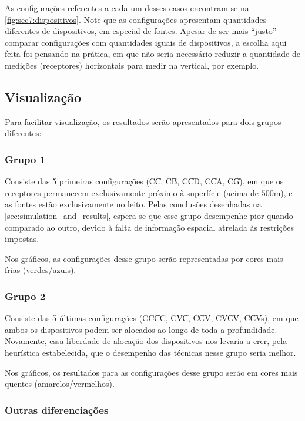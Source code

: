As configurações referentes a cada um desses casos encontram-se na \cref{fig:sec7:dispositivos}. Note que as configurações apresentam quantidades diferentes de dispositivos, em especial de fontes. Apesar de ser mais ``justo'' comparar configurações com quantidades iguais de dispositivos, a escolha aqui feita foi pensando na prática, em que não seria necessário reduzir a quantidade de medições (receptores) horizontais para medir na vertical, por exemplo.



\subsection{Visualização}

Para facilitar visualização, os resultados serão apresentados para dois grupos diferentes:

\subsubsection*{Grupo 1}

Consiste das 5 primeiras configurações (C\|C, C\|B, C\|CD, C\|CA, C\|G), em que os receptores permanecem exclusivamente próximo à superfície (acima de $500\si{\meter}$), e as fontes estão exclusivamente no leito. Pelas conclusões desenhadas na \cref{sec:simulation_and_results}, espera-se que esse grupo desempenhe pior quando comparado ao outro, devido à falta de informação espacial atrelada às restrições impostas.

Nos gráficos, as configurações desse grupo serão representadas por cores mais frias (verdes/azuis).

\subsubsection*{Grupo 2}

Consiste das 5 últimas configurações (CC\|CC, CV\|C, C\|CV, CV\|CV, C\|CVs), em que ambos os dispositivos podem ser alocados ao longo de toda a profundidade. Novamente, essa liberdade de alocação dos dispositivos nos levaria a crer, pela heurística estabelecida, que o desempenho das técnicas nesse grupo seria melhor.

Nos gráficos, os resultados para as configurações desse grupo serão em cores mais quentes (amarelos/vermelhos).

\subsubsection*{Outras diferenciações}

